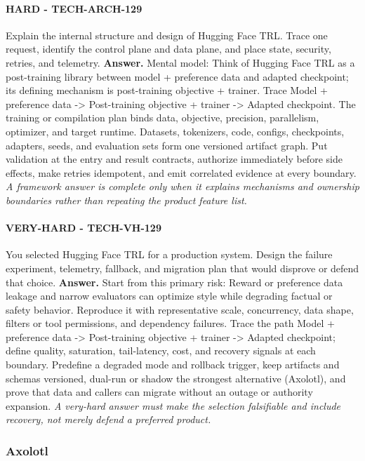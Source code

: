 \paragraph{HARD - TECH-ARCH-129} Explain the internal structure and design of Hugging Face TRL. Trace one request, identify the control plane and data plane, and place state, security, retries, and telemetry.
\textbf{Answer.} Mental model: Think of Hugging Face TRL as a post-training library between model + preference data and adapted checkpoint; its defining mechanism is post-training objective + trainer. Trace Model + preference data -> Post-training objective + trainer -> Adapted checkpoint. The training or compilation plan binds data, objective, precision, parallelism, optimizer, and target runtime. Datasets, tokenizers, code, configs, checkpoints, adapters, seeds, and evaluation sets form one versioned artifact graph. Put validation at the entry and result contracts, authorize immediately before side effects, make retries idempotent, and emit correlated evidence at every boundary.
\textit{A framework answer is complete only when it explains mechanisms and ownership boundaries rather than repeating the product feature list.}
\paragraph{VERY-HARD - TECH-VH-129} You selected Hugging Face TRL for a production system. Design the failure experiment, telemetry, fallback, and migration plan that would disprove or defend that choice.
\textbf{Answer.} Start from this primary risk: Reward or preference data leakage and narrow evaluators can optimize style while degrading factual or safety behavior. Reproduce it with representative scale, concurrency, data shape, filters or tool permissions, and dependency failures. Trace the path Model + preference data -> Post-training objective + trainer -> Adapted checkpoint; define quality, saturation, tail-latency, cost, and recovery signals at each boundary. Predefine a degraded mode and rollback trigger, keep artifacts and schemas versioned, dual-run or shadow the strongest alternative (Axolotl), and prove that data and callers can migrate without an outage or authority expansion.
\textit{A very-hard answer must make the selection falsifiable and include recovery, not merely defend a preferred product.}
\subsubsection*{Axolotl}

